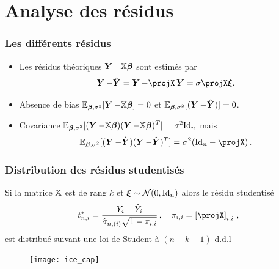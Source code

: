 \section{Analyse des résidus}
\begin{frame}
\frametitle{Les différents résidus}
\begin{itemize}
\item Les résidus théoriques $\operatorname{\boldsymbol{Y}} - \mathbb{X} \boldsymbol{\beta}$ sont estimés par
$$
\bY - \predY = \bY - \projX \bY = \sigma \projX \bnoise.
$$
\item \alert{Absence de bias}  $\operatorname{{\mathbb E}}_{\boldsymbol{\beta},\sigma^2}[\operatorname{\boldsymbol{Y}}- \mathbb{X} \boldsymbol{\beta}]= 0$ et
$\operatorname{{\mathbb E}}_{\boldsymbol{\beta},\sigma^2}[(\operatorname{\boldsymbol{Y}} - \hat{\boldsymbol{Y}})]=0$.
\item \alert{Covariance} $\operatorname{{\mathbb E}}_{\boldsymbol{\beta},\sigma^2}[(\operatorname{\boldsymbol{Y}}- \mathbb{X} \boldsymbol{\beta}) (\operatorname{\boldsymbol{Y}} -\mathbb{X} \boldsymbol{\beta})^T]= \sigma^2 \mathrm{Id}_{n}$ mais
\[
\PE_{\truebeta,\sigma^2}[ (\bY - \predY) (\bY - \predY)^T] = \sigma^2 (\Id{n} - \projX) \eqsp.
\]
\end{itemize}
\end{frame}


\begin{frame}
\frametitle{Distribution des résidus studentisés}
\begin{theo}
Si la matrice $\mathbb{X}$ est de rang $k$ et $\boldsymbol{\xi} \sim \mathcal{N}(0,\mathrm{Id}_{n})$ alors le résidu studentisé
\[
t_{n,i}^*= \frac{Y_i - \hat{Y}_i}{\hat{\sigma}_{n,(i)} \sqrt{1-\pi_{i,i}}} \eqsp, \quad \pi_{i,i}= \left[ \projX \right]_{i,i} \eqsp,
\]
est distribué suivant une loi de Student à $(n-k-1)$ d.d.l
\end{theo}
\end{frame}

\begin{frame}
\begin{figure}
  \centering
  \texttt{[image: ice\_cap]}
\end{figure}
\end{frame}

